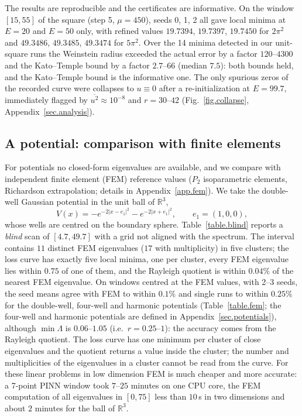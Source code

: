 \documentclass[10pt]{amsart}
\theoremstyle{definition}
\theoremstyle{remark}
\theoremstyle{plain}
\newcommand{\R}{\mathbb{R}}
\begin{document}
The results are reproducible and the certificates are informative. On the window $[15,55]$ of the
square (step 5, $\mu=450$), seeds 0, 1, 2 all gave local minima at $E=20$ and $E=50$ only, with refined
values $19.7394$, $19.7397$, $19.7450$ for $2\pi^2$ and $49.3486$, $49.3485$, $49.3474$ for $5\pi^2$. Over
the 14 minima detected in our unit-square runs the Weinstein radius exceeded the actual error by a
factor $120$--$4300$ and the Kato--Temple bound by a factor $2.7$--$66$ (median $7.5$): both bounds held,
and the Kato--Temple bound is the informative one. The only spurious zeros of the recorded curve were
collapses to $u\equiv0$ after a re-initialization at $E=99.7$, immediately flagged by
$\overline{u^2}\approx10^{-8}$ and $r=30$--$42$ (Fig.~\ref{fig.collapse}, Appendix~\ref{sec.analysis}).

\subsection{A potential: comparison with finite elements}\label{sec.fem}
For potentials no closed-form eigenvalues are available, and we compare with independent finite
element (FEM) reference values ($P_2$ isoparametric elements, Richardson extrapolation; details in
Appendix~\ref{app.fem}). We take the double-well Gaussian potential in the unit ball of $\R^3$,
\[
V(x)=-e^{-2|x-e_1|^2}-e^{-2|x+e_1|^2},\qquad e_1=(1,0,0),
\]
whose wells are centred on the boundary sphere. Table~\ref{table.blind} reports a \emph{blind} scan of
$[4.7,49.7]$ with a grid not aligned with the spectrum. The interval contains $11$ distinct FEM
eigenvalues ($17$ with multiplicity) in five clusters; the loss curve has exactly five local minima,
one per cluster, every FEM eigenvalue lies within $0.75$ of one of them, and the Rayleigh quotient is
within $0.04\%$ of the nearest FEM eigenvalue. On windows centred at the FEM values, with 2--3 seeds,
the seed means agree with FEM to within $0.1\%$ and single runs to within $0.25\%$ for the double-well,
four-well and harmonic potentials (Table~\ref{table.fem}; the four-well and harmonic potentials are
defined in Appendix~\ref{sec.potentials}), although $\min\Lambda$
is $0.06$--$1.05$ (i.e.\ $r=0.25$--$1$): the accuracy comes from the Rayleigh quotient. The loss curve
has one minimum per cluster of close eigenvalues and the quotient returns a value inside the cluster;
the number and multiplicities of the eigenvalues in a cluster cannot be read from the curve. For these
linear problems in low dimension FEM is much cheaper and more accurate: a 7-point PINN window took
$7$--$25$ minutes on one CPU core, the FEM computation of all eigenvalues in $[0,75]$ less than $10$\,s in
two dimensions and about $2$ minutes for the ball of $\R^3$.
\end{document}
